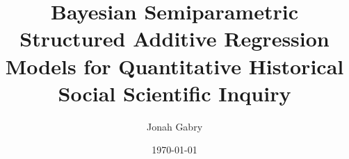 \documentclass[12pt] {report}
\begin{document}
\title{Bayesian Semiparametric Structured Additive Regression Models for Quantitative Historical Social Scientific Inquiry}
\author{Jonah Gabry}
\date \today
\maketitle
\thispagestyle{empty}
\bigskip
\tableofcontents
\pagebreak
\setcounter{page}{1}




%

\pagebreak
\nocite{r_software}
\singlespacing

\end{document}
